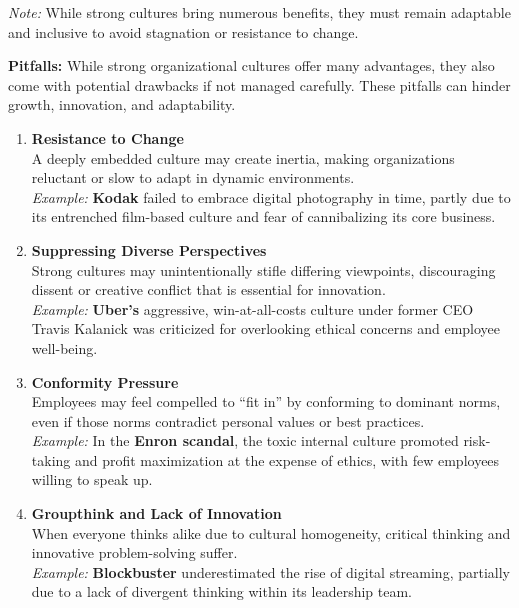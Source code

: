 \documentclass[10pt,a4paper]{book}
\begin{document}
\begin{multicols}{2}
\textit{Note:} While strong cultures bring numerous benefits, they must remain adaptable and inclusive to avoid stagnation or resistance to change.

\vspace{1cm}

\textbf{Pitfalls:}
While strong organizational cultures offer many advantages, they also come with potential drawbacks if not managed carefully. These pitfalls can hinder growth, innovation, and adaptability.

\begin{enumerate}
    \item \textbf{Resistance to Change} \\
    A deeply embedded culture may create inertia, making organizations reluctant or slow to adapt in dynamic environments.\\
    \textit{Example:} \textbf{Kodak} failed to embrace digital photography in time, partly due to its entrenched film-based culture and fear of cannibalizing its core business.

    \item \textbf{Suppressing Diverse Perspectives} \\
    Strong cultures may unintentionally stifle differing viewpoints, discouraging dissent or creative conflict that is essential for innovation.\\
    \textit{Example:} \textbf{Uber's} aggressive, win-at-all-costs culture under former CEO Travis Kalanick was criticized for overlooking ethical concerns and employee well-being.

    \item \textbf{Conformity Pressure} \\
    Employees may feel compelled to “fit in” by conforming to dominant norms, even if those norms contradict personal values or best practices.\\
    \textit{Example:} In the \textbf{Enron scandal}, the toxic internal culture promoted risk-taking and profit maximization at the expense of ethics, with few employees willing to speak up.

    \item \textbf{Groupthink and Lack of Innovation} \\
    When everyone thinks alike due to cultural homogeneity, critical thinking and innovative problem-solving suffer.\\
    \textit{Example:} \textbf{Blockbuster} underestimated the rise of digital streaming, partially due to a lack of divergent thinking within its leadership team.


\end{enumerate}
\end{multicols}
\end{document}

